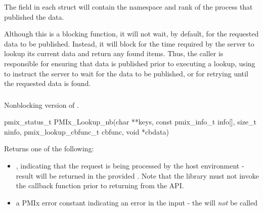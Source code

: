 The  field in each  struct will contain the namespace and rank of the process that published the data.

\adviceuserstart
Although this is a blocking function, it will not wait, by default, for the requested data to be published.
Instead, it will block for the time required by the server to lookup its current data and return any found items.
Thus, the caller is responsible for ensuring that data is published prior to executing a lookup, using  to instruct the server to wait for the data to be published, or for retrying until the requested data is found.
\adviceuserend

\subsubsection{}

\summary

Nonblocking version of .

\format

\cspecificstart
\begin{codepar}
pmix_status_t
PMIx_Lookup_nb(char **keys,
               const pmix_info_t info[], size_t ninfo,
               pmix_lookup_cbfunc_t cbfunc, void *cbdata)
\end{codepar}
\cspecificend

\begin{arglist}
\end{arglist}

Returns one of the following:

\begin{itemize}
    \item {}, indicating that the request is being processed by the host environment - result will be returned in the provided . Note that the library must not invoke the callback function prior to returning from the \ac{API}.
    \item a PMIx error constant indicating an error in the input - the  will \textit{not} be called
\end{itemize}

